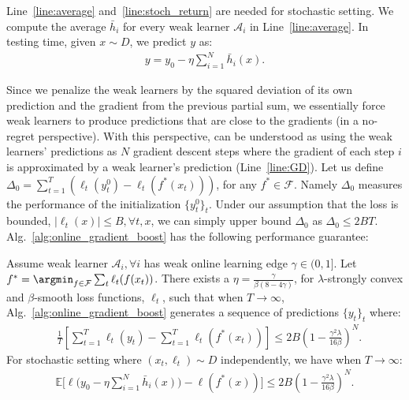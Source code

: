Line~\ref{line:average} and~\ref{line:stoch_return} are needed for stochastic setting. We compute the average $\bar{h}_i$ for every weak learner $\mathcal{A}_i$ in Line~\ref{line:average}. In testing time, given $x\sim D$, we predict $y$ as:
\begin{align}
\label{eq:predict_avg}
y = y_0 - \eta\sum_{i=1}^N \bar{h}_i(x). 
\end{align}


Since we penalize the weak learners by the squared deviation of its own prediction and the gradient from the previous partial sum, we essentially force weak learners to produce predictions that are close to the gradients (in a no-regret perspective). With this perspective, \algshort can be understood as using the weak learners' predictions as $N$ gradient descent steps where the gradient of each step $i$ is approximated by a weak learner's prediction (Line~\ref{line:GD}). Let us define $\Delta_0 = \sum_{t=1}^T (\ell_t(y_t^0) - \ell_t(f^*(x_t)))$, for any $f^*\in\mathcal{F}$. Namely $\Delta_0$ measures the performance of the initialization $\{y_t^0\}_t$. Under our assumption that the loss is bounded, $|\ell_t(x)|\leq B,\forall t,x$, we can simply upper bound $\Delta_0$ as $\Delta_0\leq 2BT$.  Alg.~\ref{alg:online_gradient_boost} has the following performance guarantee:
\begin{theorem}
\label{them:smooth_strongly_convex}
Assume weak learner $\mathcal{A}_i,\forall i$ has weak online learning edge $\gamma\in(0,1]$. Let $f^* = \argmin_{f\in\mathcal{F}}\sum_t\ell_t(f(x_t))$. There exists a $\eta = \frac{\gamma}{\beta(8-4\gamma)}$, for $\lambda$-strongly convex and $\beta$-smooth loss functions, $\ell _t$, such that when $T\to\infty$, Alg.~\ref{alg:online_gradient_boost} generates a sequence of predictions $\{y_t\}_t$ where:
\begin{align}
\label{eq:regret_bound_smooth}
&\frac{1}{T}[\sum_{t=1}^T\ell_t(y_t) -\sum_{t=1}^T\ell_t(f^*(x_t))]
\leq 2B(1 - \frac{\gamma^2\lambda}{16\beta})^N. %
\end{align} For stochastic setting where $(x_t, \ell_t)\sim D$ independently, we have when $T\to\infty$:
\begin{align}
\label{eq:smooth_result_stoch}
\mathbb{E}\big[\ell\big(y_0-\eta\sum_{i=1}^N \bar{h}_i(x)\big) -  \ell(f^*(x)) \big]\leq 2B(1-\frac{\gamma^2\lambda}{16\beta})^N.
\end{align}
\end{theorem} 
